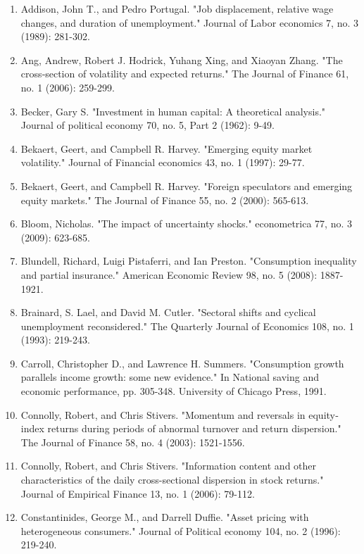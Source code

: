 \documentclass[12pt]{article}
\begin{document}
\begin{enumerate}

    \item{Addison, John T., and Pedro Portugal. "Job displacement, relative wage changes, and duration of unemployment." Journal of Labor economics 7, no. 3 (1989): 281-302.}
    \item{Ang, Andrew, Robert J. Hodrick, Yuhang Xing, and Xiaoyan Zhang. "The cross‐section of volatility and expected returns." The Journal of Finance 61, no. 1 (2006): 259-299.}
    \item{Becker, Gary S. "Investment in human capital: A theoretical analysis." Journal of political economy 70, no. 5, Part 2 (1962): 9-49.}
    \item{Bekaert, Geert, and Campbell R. Harvey. "Emerging equity market volatility." Journal of Financial economics 43, no. 1 (1997): 29-77.}
    \item{Bekaert, Geert, and Campbell R. Harvey. "Foreign speculators and emerging equity markets." The Journal of Finance 55, no. 2 (2000): 565-613.}
    \item{Bloom, Nicholas. "The impact of uncertainty shocks." econometrica 77, no. 3 (2009): 623-685.}
    \item{Blundell, Richard, Luigi Pistaferri, and Ian Preston. "Consumption inequality and partial insurance." American Economic Review 98, no. 5 (2008): 1887-1921.}
    \item{Brainard, S. Lael, and David M. Cutler. "Sectoral shifts and cyclical unemployment reconsidered." The Quarterly Journal of Economics 108, no. 1 (1993): 219-243.}
    \item{Carroll, Christopher D., and Lawrence H. Summers. "Consumption growth parallels income growth: some new evidence." In National saving and economic performance, pp. 305-348. University of Chicago Press, 1991.}
    \item{Connolly, Robert, and Chris Stivers. "Momentum and reversals in equity‐index returns during periods of abnormal turnover and return dispersion." The Journal of Finance 58, no. 4 (2003): 1521-1556.}
    \item{Connolly, Robert, and Chris Stivers. "Information content and other characteristics of the daily cross-sectional dispersion in stock returns." Journal of Empirical Finance 13, no. 1 (2006): 79-112.}
    \item{Constantinides, George M., and Darrell Duffie. "Asset pricing with heterogeneous consumers." Journal of Political economy 104, no. 2 (1996): 219-240.}

\end{enumerate}
\end{document}
